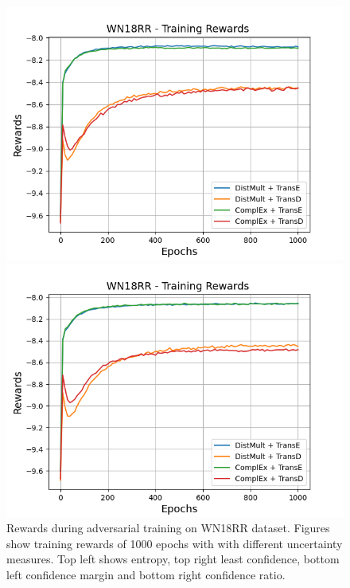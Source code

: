\begin{figure}[H]
\begin{minipage}{.45\textwidth}
      \includegraphics[width=0.9\linewidth]{figures/results/gan_train/not_pretrained/uncertainty/max_distribution/confidence_margin/wn18rr/uncertainty_wn18rr_rew.png}
    \end{minipage}%
    \begin{minipage}{.45\textwidth}
      \centering
      \includegraphics[width=0.9\linewidth]{figures/results/gan_train/not_pretrained/uncertainty/max_distribution/confidence_ratio/wn18rr/uncertainty_wn18rr_rew.png}
    \end{minipage}%
    \caption{Rewards during adversarial training on \textsc{WN18RR} dataset. 
    Figures show training rewards of 1000 epochs with \ussoftmax with different uncertainty measures.
    Top left shows entropy, top right least confidence, 
    bottom left confidence margin and bottom right confidence ratio.}
    \label{fig:advtrain_metrics_wn18rr_rew}
\end{figure}


